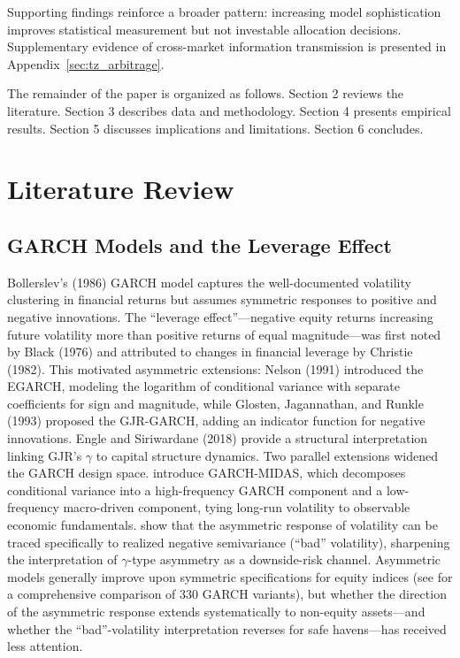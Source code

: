 Supporting findings reinforce a broader pattern: increasing model sophistication improves statistical measurement but not investable allocation decisions. Supplementary evidence of cross-market information transmission is presented in Appendix~\ref{sec:tz_arbitrage}.

The remainder of the paper is organized as follows. Section 2 reviews the literature. Section 3 describes data and methodology. Section 4 presents empirical results. Section 5 discusses implications and limitations. Section 6 concludes.



\section{Literature Review}

\subsection{GARCH Models and the Leverage Effect}

Bollerslev's (1986) GARCH model captures the well-documented volatility clustering in financial returns but assumes symmetric responses to positive and negative innovations. The ``leverage effect''---negative equity returns increasing future volatility more than positive returns of equal magnitude---was first noted by Black (1976) and attributed to changes in financial leverage by Christie (1982). This motivated asymmetric extensions: Nelson (1991) introduced the EGARCH, modeling the logarithm of conditional variance with separate coefficients for sign and magnitude, while Glosten, Jagannathan, and Runkle (1993) proposed the GJR-GARCH, adding an indicator function for negative innovations. Engle and Siriwardane (2018) provide a structural interpretation linking GJR's $\gamma$ to capital structure dynamics. Two parallel extensions widened the GARCH design space. \citet{engleGhyselsSohn2013} introduce GARCH-MIDAS, which decomposes conditional variance into a high-frequency GARCH component and a low-frequency macro-driven component, tying long-run volatility to observable economic fundamentals. \citet{pattonSheppard2015} show that the asymmetric response of volatility can be traced specifically to realized negative semivariance (``bad'' volatility), sharpening the interpretation of $\gamma$-type asymmetry as a downside-risk channel. Asymmetric models generally improve upon symmetric specifications for equity indices (see \citealt{hansen2005} for a comprehensive comparison of 330 GARCH variants), but whether the direction of the asymmetric response extends systematically to non-equity assets---and whether the ``bad''-volatility interpretation reverses for safe havens---has received less attention.


